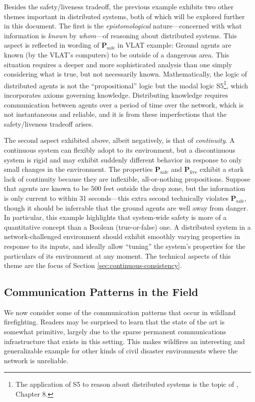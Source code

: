 \documentclass[]             %
{NASA}                       %
\theoremstyle{definition}
\begin{document}
Besides the safety/liveness tradeoff, the previous example exhibits
two other themes important in distributed systems, both of which will
be explored further in this document. The first is the
\emph{epistomological} nature---concerned with what information is
\emph{known} by \emph{whom}---of reasoning about distributed
systems. This aspect is reflected in wording of
$\textbf{P}_\textrm{safe}$ in VLAT example: Ground agents are known
(by the VLAT's computers) to be outside of a dangerous area. This
situation requires a deeper and more sophisticated analysis than one
simply considering what is true, but not necessarily
known. Mathematically, the logic of distributed agents is not the
``propositional'' logic but the modal logic S5\footnote{The
  application of S5 to reason about distributed systems is the topic
  of \cite{kshemkalyani_singhal_2008}, Chapter 8.}, which incorporates
axioms governing knowledge. Distributing knowledge requires
communication between agents over a period of time over the network,
which is not instantaneous and reliable, and it is from these
imperfections that the safety/liveness tradeoff arises.

The second aspect exhibited above, albeit negatively, is that of
\emph{continuity}. A continuous system can flexibly adopt to its
environment, but a discontinuous system is rigid and may exhibit
suddenly different behavior in response to only small changes in the
environment. The properties $\mathbf{P}_\textrm{safe}$ and
$\mathbf{P}_\textrm{live}$ exhibit a stark lack of continuity because
they are inflexible, all-or-nothing propositions. Suppose that agents
are known to be $500$ feet outside the drop zone, but the information
is only current to within 31 seconds---this extra second technically
violates $\mathbf{P}_\textrm{safe}$, though it should be inferrable
that the ground agents are well away from danger. In particular, this
example highlights that system-wide safety is more of a quantitative
concept than a Boolean (true-or-false) one. A distributed system in a
network-challenged environment should exhibit smoothly varying
properties in response to its inputs, and ideally allow ``tuning'' the
system's properties for the particulars of its environment at any
moment. The technical aspects of this theme are the focus of Section
\ref{sec:continuous-consistency}.

\subsection{Communication Patterns in the Field}
\label{ssec:communication-patterns}
We now consider some of the communication patterns that occur in
wildland firefighting. Readers may be surprised to learn that the
state of the art is somewhat primitive, largely due to the sparse
permanent communications infrastructure that exists in this
setting. This makes wildfires an interesting and generalizable example
for other kinds of civil disaster environments where the network is
unreliable.
\end{document}
